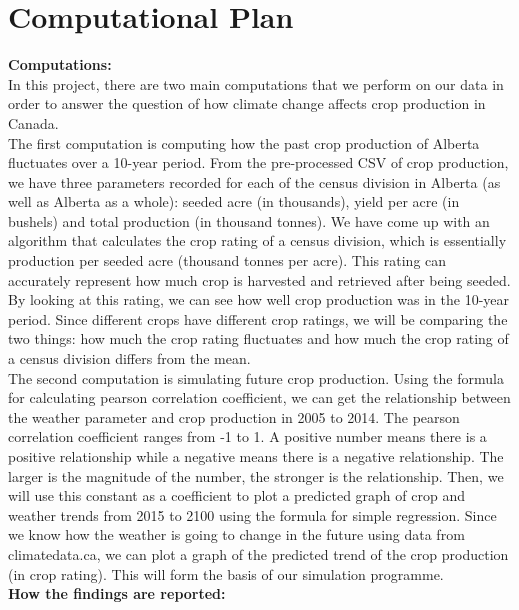 \documentclass[fontsize=11pt]{article}
\begin{document}
\section*{Computational Plan}
\textbf{Computations:} \\

In this project, there are two main computations that we perform on our data in order to answer the question of how climate change affects crop production in Canada.  \\

The first computation is computing how the past crop production of Alberta fluctuates over a 10-year period. From the pre-processed CSV of crop production, we have three parameters recorded for each of the census division in Alberta (as well as Alberta as a whole): seeded acre (in thousands), yield per acre (in bushels) and total production (in thousand tonnes). We have come up with an algorithm that calculates the crop rating of a census division, which is essentially production per seeded acre (thousand tonnes per acre). This rating can accurately represent how much crop is harvested and retrieved after being seeded. By looking at this rating, we can see how well crop production was in the 10-year period. Since different crops have different crop ratings, we will be comparing the two things: how much the crop rating fluctuates and how much the crop rating of a census division differs from the mean. \\

The second computation is simulating future crop production. Using the formula for calculating pearson correlation coefficient, we can get the relationship between the weather parameter and crop production in 2005 to 2014. The pearson correlation coefficient ranges from -1 to 1. A positive number means there is a positive relationship while a negative means there is a negative relationship. The larger is the magnitude of the number, the stronger is the relationship. Then, we will use this constant as a coefficient to plot a predicted graph of crop and weather trends from 2015 to 2100 using the formula for simple regression. Since we know how the weather is going to change in the future using data from climatedata.ca, we can plot a graph of the predicted trend of the crop production (in crop rating). This will form the basis of our simulation programme.\\

\textbf{How the findings are reported:} \\
\end{document}
